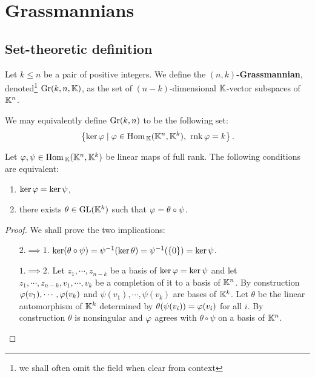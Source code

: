 \chapter{Grassmannians}

\section{Set-theoretic definition}
\begin{definition}[Grassmannian]
Let $k\leq n$ be a pair of positive integers. We define the \textbf{$(n,k)$-Grassmannian}, denoted\footnote{we shall often omit the field when clear from context} $\mathrm{Gr}(k,n,\mathbb{K})$, as the set of $(n-k)$-dimensional $\mathbb{K}$-vector subspaces of $\mathbb{K}^n$.
\end{definition}
\begin{remark}
We may equivalently define $\mathrm{Gr}(k,n)$ to be the following set:
\[\cpa{\ker \vp\mid \vp\in \Hom_\K(\K^n,\K^k),\ \rnk \vp=k}.\]
\end{remark}

\begin{lemma}\label{kerAkerBVSActionOfGLk}
Let $\varphi,\psi\in \mathrm{Hom}\,_{\mathbb{K}}(\mathbb{K}^n,\mathbb{K}^k)$ be linear maps of full rank. The following conditions are equivalent:
\begin{enumerate}
    \item $\ker\varphi=\ker\psi$,
    \item there exists $\theta\in \mathrm{GL}(\mathbb{K}^k)$ such that $\varphi=\theta\circ \psi$. 
\end{enumerate}
\end{lemma}
\begin{proof}
We shall prove the two implications:
\setlength{\leftmargini}{0cm}
\begin{itemize}
\item[$\boxed{2.\implies 1.}$] $\ker(\theta\circ \psi)=\psi^{-1}(\ker \theta)=\psi^{-1}(\left\{{0}\right\})=\ker \psi$. 
\item[$\boxed{1.\implies 2.}$] Let $z_1,\cdots, z_{n-k}$ be a basis of $\ker \varphi=\ker \psi$ and let $z_1,\cdots, z_{n-k}, v_1,\cdots, v_k$ be a completion of it to a basis of $\mathbb{K}^n$. By construction $\varphi(v_1),\cdots, \varphi(v_k)$ and $\psi(v_1),\cdots, \psi(v_k)$ are bases of $\mathbb{K}^k$. Let $\theta$ be the linear automorphism of $\mathbb{K}^k$ determined by $\theta(\psi(v_i))=\varphi(v_i)$ for all $i$. By construction $\theta$ is nonsingular and $\varphi$ agrees with $\theta\circ \psi$ on a basis of $\mathbb{K}^n$.
\end{itemize}
\setlength{\leftmargini}{0.5cm}
\end{proof}

